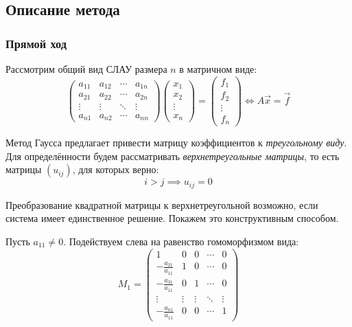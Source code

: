 \subsection{Описание метода}

\subsubsection{Прямой ход}

Рассмотрим общий вид СЛАУ размера $n$ в матричном виде:
\[
  \begin{pmatrix}
    a_{11} & a_{12} & \cdots & a_{1n} \\
    a_{21} & a_{22} & \cdots & a_{2n} \\
    \vdots & \vdots & \ddots & \vdots \\
    a_{n1} & a_{n2} & \cdots & a_{nn}
  \end{pmatrix}
  \begin{pmatrix}
    x_1 \\
    x_2 \\
    \vdots \\
    x_n
  \end{pmatrix}
  =
  \begin{pmatrix}
    f_1 \\
    f_2 \\
    \vdots \\
    f_n
  \end{pmatrix}
  \iff A\vec{x}=\vec{f}
\]

Метод Гаусса предлагает привести матрицу коэффициентов к \textit{треугольному виду}. Для определённости будем рассматривать \textit{верхнетреугольные матрицы}, то есть матрицы $(u_{ij})$, для которых верно:
\[
  i>j\implies u_{ij}=0
\]

Преобразование квадратной матрицы к верхнетреугольной возможно, если система имеет единственное решение. Покажем это конструктивным способом.

Пусть $a_{11}\neq 0$. Подействуем слева на равенство гомоморфизмом вида:
\[
  M_1 = \begin{pmatrix}
    1 & 0 & 0 & \cdots & 0 \\
    -\frac{a_{21}}{a_{11}} & 1 & 0 & \cdots & 0 \\
    -\frac{a_{31}}{a_{11}} & 0 & 1 & \cdots & 0 \\
    \vdots & \vdots & \vdots & \ddots & \vdots \\
    -\frac{a_{n1}}{a_{11}} & 0 & 0 & \cdots & 1
  \end{pmatrix}
\]

